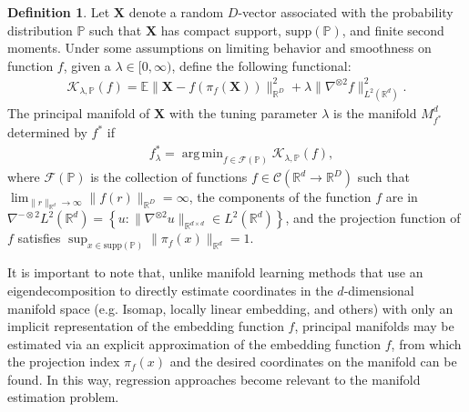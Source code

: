 \documentclass[12pt]{article}
\DeclareMathOperator*{\argmin}{arg\,min}
\theoremstyle{definition}
\newtheorem{definition}{Definition}
\begin{document}
\begin{definition}
  \label{def:principal_manifolds}
  Let $\mathbf{X}$ denote a random $D$-vector associated with the probability distribution $\mathbb{P}$ such that $\mathbf{X}$ has compact support, $\text{supp}(\mathbb{P})$, and finite second moments. Under some assumptions on limiting behavior and smoothness on function $f$, given a $\lambda \in [0, \infty)$, define the following functional:
  \begin{align}\label{eq:pme_kappa}
\mathcal{K}_{\lambda, \mathbb{P}}(f) = \mathbb{E}\|\mathbf{X} - f(\pi_f(\mathbf{X}))\|_{\mathbb{R}^{D}}^2 + \lambda\|\nabla^{\otimes 2}f\|_{L^2(\mathbb{R}^{d})}^2. 
  \end{align}
  The principal manifold of $\mathbf{X}$ with the tuning parameter $\lambda$ is the manifold $M_{f^{*}}^{d}$ determined by $f^{*}$ if
  \begin{equation}\nonumber
    \begin{aligned}
        & f_{\lambda}^{*} = \argmin_{f \in \mathcal{F}(\mathbb{P})}\mathcal{K}_{\lambda, \mathbb{P}}(f),
    \end{aligned}
  \end{equation}
where $\mathcal{F}(\mathbb{P})$ is the collection of functions $f \in \mathcal{C}(\mathbb{R}^{d} \to \mathbb{R}^{D})$ such that $\lim_{\|r\|_{\mathbb{R}^{d}} \to \infty}\|f(r)\|_{\mathbb{R}^{D}} = \infty$, the components of the function $f$ are in $\nabla^{-\otimes 2}L^2(\mathbb{R}^{d}) = \left\{u : \|\nabla^{\otimes 2} u\|_{\mathbb{R}^{d \times d}} \in L^2(\mathbb{R}^{d})\right\}$, and the projection function of $f$ satisfies $\sup_{x \in \text{supp}(\mathbb{P})}\|\pi_f(x)\|_{\mathbb{R}^{d}} = 1$.
\end{definition}

It is important to note that, unlike manifold learning methods that use an eigendecomposition to directly estimate coordinates in the $d$-dimensional manifold space (e.g. Isomap, locally linear embedding, and others) with only an implicit representation of the embedding function $f$, principal manifolds may be estimated via an explicit approximation of the embedding function $f$, from which the projection index $\pi_f(x)$ and the desired coordinates on the manifold can be found. In this way, regression approaches become relevant to the manifold estimation problem.
\end{document}
